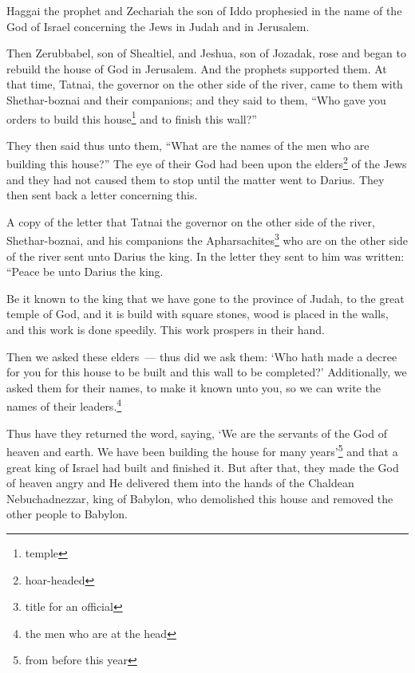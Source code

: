 
\begin{inparaenum}
     Haggai the prophet and Zechariah the son of Iddo prophesied in the name of the God of Israel concerning the Jews in Judah and in Jerusalem.%
    
     Then Zerubbabel, son of Shealtiel, and Jeshua, son of Jozadak, rose and began to rebuild the house of God in Jerusalem. And the prophets supported them.%
     At that time, Tatnai, the governor on the other side of the river, came to them with Shethar-boznai and their companions; and they said to them, ``Who gave you orders to build this house\footnote{temple} and to finish this wall?''%
    
     They then said thus unto them, ``What are the names of the men who are building this house?''%
     The eye of their God had been upon the elders\footnote{hoar-headed} of the Jews and they had not caused them to stop until the matter went to Darius. They then sent back a letter concerning this.%
    
     A copy of the letter that Tatnai the governor on the other side of the river, Shethar-boznai, and his companions the Apharsachites\footnote{title for an official} who are on the other side of the river sent unto Darius the king.%
     In the letter they sent to him was written: ``Peace be unto Darius the king.%
    
     Be it known to the king that we have gone to the province of Judah, to the great temple of God, and it is build with square stones, wood is placed in the walls, and this work is done speedily. This work prospers in their hand.%
    
     Then we asked these elders~--- thus did we ask them: `Who hath made a decree for you for this house to be built and this wall to be completed?'%
     Additionally, we asked them for their names, to make it known unto you, so we can write the names of their leaders.\footnote{the men who are at the head}%
    
     Thus have they returned the word, saying, `We are the servants of the God of heaven and earth. We have been building the house for many years'\footnote{from before this year} and that a great king of Israel had built and finished it.%
     But after that, they made the God of heaven angry and He delivered them into the hands of the Chaldean Nebuchadnezzar, king of Babylon, who demolished this house and removed the other people to Babylon.%
    

\end{inparaenum}
